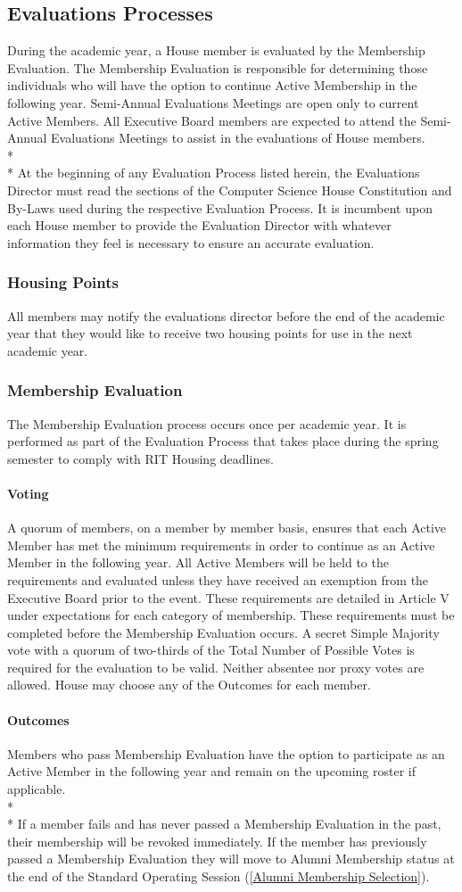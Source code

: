 \documentclass{article}
\newcommand{\bsection}[1]{\subsection{#1} \label{#1}}
\newcommand{\bsubsection}[1]{\subsubsection{#1} \label{#1}}
\newcommand{\bsubsubsection}[1]{\paragraph{#1} \label{#1}}
\begin{document}
\bsection{Evaluations Processes}
During the academic year, a House member is evaluated by the Membership Evaluation.
The Membership Evaluation is responsible for determining those individuals who will have the option to continue Active Membership in the following year.
Semi-Annual Evaluations Meetings are open only to current Active Members.
All Executive Board members are expected to attend the Semi-Annual Evaluations Meetings to assist in the evaluations of House members.
\\* \\*
At the beginning of any Evaluation Process listed herein, the Evaluations Director must read the sections of the Computer Science House Constitution and By-Laws used during the respective Evaluation Process.
It is incumbent upon each House member to provide the Evaluation Director with whatever information they feel is necessary to ensure an accurate evaluation.
\bsubsection{Housing Points}
All members may notify the evaluations director before the end of the academic year that they would like to receive two housing points for use in the next academic year.
\bsubsection{Membership Evaluation}
The Membership Evaluation process occurs once per academic year.
It is performed as part of the Evaluation Process that takes place during the spring semester to comply with RIT Housing deadlines.
\bsubsubsection{Voting}
A quorum of members, on a member by member basis, ensures that each Active Member has met the minimum requirements in order to continue as an Active Member in the following year.
All Active Members will be held to the requirements and evaluated unless they have received an exemption from the Executive Board prior to the event.
These requirements are detailed in Article V under expectations for each category of membership.
These requirements must be completed before the Membership Evaluation occurs.
A secret Simple Majority vote with a quorum of two-thirds of the Total Number of Possible Votes is required for the evaluation to be valid.
Neither absentee nor proxy votes are allowed.
House may choose any of the Outcomes for each member.
\bsubsubsection{Outcomes}
Members who pass Membership Evaluation have the option to participate as an Active Member in the following year and remain on the upcoming roster if applicable.
\\* \\*
If a member fails and has never passed a Membership Evaluation in the past, their membership will be revoked immediately.
If the member has previously passed a Membership Evaluation they will move to Alumni Membership status at the end of the Standard Operating Session (\ref{Alumni Membership Selection}).
\end{document}
